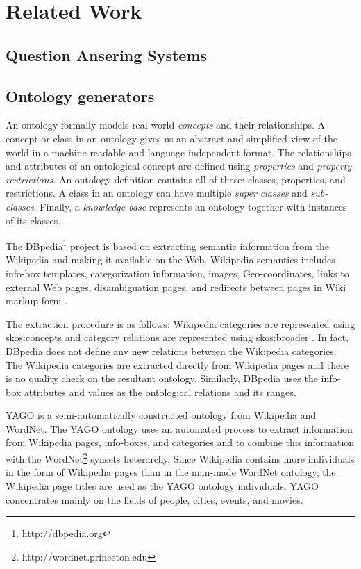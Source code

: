 \section{Related Work}
\label{sec:relatedwork}

\subsection{Question Ansering Systems} 

\subsection{Ontology generators} 

An ontology formally models real world \textit{concepts} and their
relationships. A concept or class in an ontology gives us an abstract and
simplified view of the world\cite{Gruber1993} in a machine-readable and
language-independent format. The relationships and attributes of an
ontological concept are defined using \textit{properties} and \textit{property
restrictions}. An ontology definition contains all of
these: classes, properties, and restrictions. A class in an ontology can have
multiple \textit{super classes} and \textit{sub-classes}. Finally, a
\textit{knowledge base} represents an ontology together with 
instances of its classes.      

The DBpedia\footnote{http://dbpedia.org} project is based on extracting
semantic information from the Wikipedia and making it available on the
Web. Wikipedia semantics includes info-box templates, categorization
information, images, Geo-coordinates, links to external Web pages,
disambiguation pages, and redirects between pages in Wiki markup form
\cite{Auer07dbpedia:a, Bizer2009}. 

The extraction procedure is as follows: Wikipedia categories are represented
using skos:concepts and category relations are represented using skos:broader
\cite{Auer07dbpedia:a, Bizer2009}. In fact, DBpedia does not define any new
relations between the Wikipedia categories. The Wikipedia categories are
extracted directly from Wikipedia pages and there is no quality check on the
resultant ontology. Similarly, DBpedia uses the info-box attributes and values
as the ontological relations and its ranges.   

YAGO is a semi-automatically constructed ontology from Wikipedia and
WordNet\cite{Suchanek2009phd}. The YAGO ontology uses an automated process to
extract information from Wikipedia pages, info-boxes, and categories and to
combine this information with the WordNet\footnote{http://wordnet.princeton.edu}
synsets heterarchy. Since Wikipedia contains more individuals in the form of
Wikipedia pages than in the man-made WordNet ontology, the Wikipedia page titles
are used as the YAGO ontology individuals. YAGO concentrates mainly on the
fields of people, cities, events, and movies\cite{Suchanek2009phd}. 

